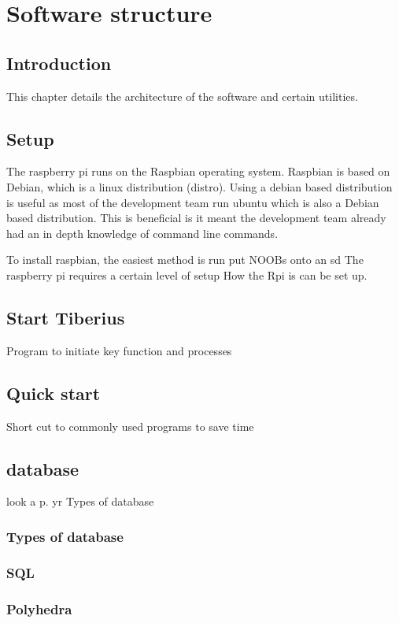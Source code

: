 \section{Software structure}
\pagestyle{aidan}

\subsection{Introduction}
This chapter details the architecture of the software and certain utilities.

\subsection{Setup}
The raspberry pi runs on the Raspbian operating system. Raspbian is based on Debian, which is a linux distribution (distro). Using a debian based distribution is useful as most of the development team run ubuntu which is also a Debian based distribution. This is beneficial is it meant the development team already had an in depth knowledge of command line commands.

To install raspbian, the easiest method is run put NOOBs onto an sd 
The raspberry pi requires a certain level of setup
How the Rpi is can be set up.

\subsection{Start Tiberius}
Program to initiate key function and processes

\subsection{Quick start}
Short cut to commonly used programs to save time

\subsection{database}
look a p. yr
Types of database

\subsubsection{Types of database}

\subsubsection{SQL}

\subsubsection{Polyhedra }











